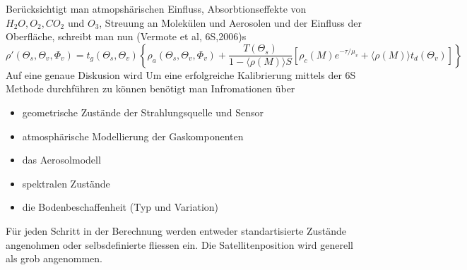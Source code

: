 \documentclass[11pt]{report}
\begin{document}
Berücksichtigt man atmopshärischen Einfluss, Absorbtionseffekte von $H_2O, O_2, CO_2$ und $O_3$, Streuung an Molekülen und Aerosolen und der Einfluss der Oberfläche, schreibt man nun \newline (Vermote et al, 6S,2006)s
\begin{equation}
\rho' (\Theta_s, \Theta_v, \Phi_v) = t_g ( \Theta_s, \Theta_v) \left\{\rho_a(\Theta_s, \Theta_v, \Phi_v)+ \frac{T(\Theta_s)}{1-\langle\rho (M)\rangle S}\left[  \rho_c(M)e^{-\tau / \mu_v} + \langle \rho(M)\rangle t_d(\Theta_v)\right] \right\}
\end{equation}\newline
Auf eine genaue Diskusion wird 
Um eine erfolgreiche Kalibrierung mittels der 6S Methode durchführen zu können benötigt man Infromationen über 
\begin{itemize}
	\item geometrische Zustände der Strahlungsquelle und Sensor
	\item atmosphärische Modellierung der Gaskomponenten
	\item das Aerosolmodell
	\item spektralen Zustände
	\item die Bodenbeschaffenheit (Typ und Variation)
\end{itemize}
Für jeden Schritt in der Berechnung werden entweder standartisierte Zustände angenohmen oder selbsdefinierte fliessen ein. Die Satellitenposition wird generell als grob angenommen.
\end{document}
